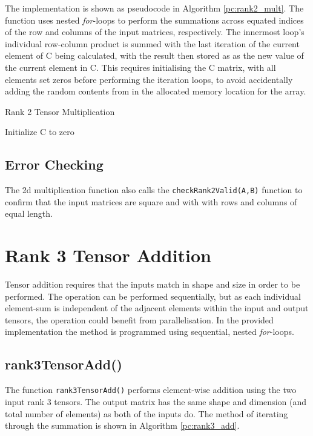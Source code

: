 \documentclass[10 pt, conference]{cssconf}
\begin{document}
The implementation is shown as pseudocode in Algorithm \ref{pc:rank2_mult}. The function uses nested \textit{for}-loops to perform the summations across equated indices of the row and columns of the input matrices, respectively. The innermost loop's individual row-column product is summed with the last iteration of the current element of C being calculated, with the result then stored as as the new value of the current element in C. This requires initialising the C matrix, with all elements set zeros before performing the iteration loops, to avoid accidentally adding the random contents from in the allocated memory location for the array.

\begin{algorithm}[ht] \small
\caption{Rank 2 Tensor Multiplication}\label{pc:rank2_mult}
    	 \SetAlgoLined
	Initialize C to zero\;
\end{algorithm}%

\subsection{Error Checking}
The 2d multiplication function also calls the \verb|checkRank2Valid(A,B)| function to confirm that the input matrices are square and with with rows and columns of equal length.

\section{Rank 3 Tensor Addition}
Tensor addition requires that the inputs match in shape and size in order to be performed. The operation can be performed sequentially, but as each individual element-sum is independent of the adjacent elements within the input and output tensors, the operation could benefit from parallelisation. In the provided implementation the method is programmed using sequential, nested \textit{for}-loops.

\subsection{rank3TensorAdd()}
The function \verb|rank3TensorAdd()| performs element-wise addition using the two input rank 3 tensors. The output matrix has the same shape and dimension (and total number of elements) as both of the inputs do. The method of iterating through the summation is shown in Algorithm \ref{pc:rank3_add}.
\end{document}
